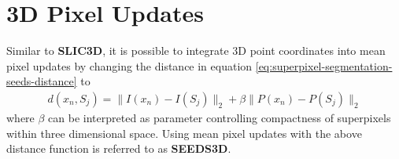 
\section{3D Pixel Updates}
\label{section:seeds-depth-3d-mean-pixel-updates}

Similar to \textbf{SLIC3D}, it is possible to integrate 3D point coordinates into mean pixel updates by changing the distance in equation \eqref{eq:superpixel-segmentation-seeds-distance} to
\begin{align}
	\label{eq:seeds-deth-ed-mean-pixels-distance}
	d(x_n, S_j) = \|I(x_n) - I(S_j)\|_2 + \beta\|P(x_n) - P(S_j)\|_2
\end{align}
where $\beta$ can be interpreted as parameter controlling compactness of superpixels within three dimensional space. Using mean pixel updates with the above distance function is referred to as \textbf{SEEDS3D}.

